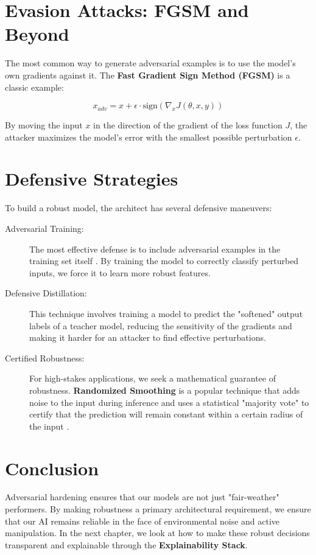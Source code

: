\section{Evasion Attacks: FGSM and Beyond}
\label{sec:evasion_attacks}

The most common way to generate adversarial examples is to use the model's own gradients against it. The \textbf{Fast Gradient Sign Method (FGSM)} is a classic example:

\begin{equation}
x_{adv} = x + \epsilon \cdot \text{sign}(\nabla_x J(\theta, x, y))
\end{equation}

By moving the input $x$ in the direction of the gradient of the loss function $J$, the attacker maximizes the model's error with the smallest possible perturbation $\epsilon$.

\section{Defensive Strategies}
\label{sec:defensive_strategies}

To build a robust model, the architect has several defensive maneuvers:

\begin{description}
  \item[Adversarial Training:] 
        The most effective defense is to include adversarial examples in the training set itself \cite{goodfellow2014}. By training the model to correctly classify perturbed inputs, we force it to learn more robust features.
  \item[Defensive Distillation:]
        This technique involves training a model to predict the "softened" output labels of a teacher model, reducing the sensitivity of the gradients and making it harder for an attacker to find effective perturbations.
  \item[Certified Robustness:]
        For high-stakes applications, we seek a mathematical guarantee of robustness. \textbf{Randomized Smoothing} is a popular technique that adds noise to the input during inference and uses a statistical "majority vote" to certify that the prediction will remain constant within a certain radius of the input \cite{cohen2019}.
\end{description}

\section{Conclusion}
\label{sec:conclusion_hardening}

Adversarial hardening ensures that our models are not just "fair-weather" performers. By making robustness a primary architectural requirement, we ensure that our AI remains reliable in the face of environmental noise and active manipulation. In the next chapter, we look at how to make these robust decisions transparent and explainable through the \textbf{Explainability Stack}.


